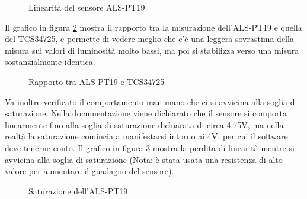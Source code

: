 \begin{figure}[h!]
	\centering
	\caption{Linearità del sensore ALS-PT19}
	\label{fig:pt19_linearity}
\end{figure}

Il grafico in figura \ref{fig:pt19_linearity3} mostra il rapporto tra la misurazione dell'ALS-PT19 e quella del TCS34725, e permette di vedere meglio che c'è una leggera sovrastima della misura sui valori di luminosità molto bassi, ma poi si stabilizza verso una misura sostanzialmente identica.
\begin{figure}[h!]
	\centering
	\caption{Rapporto tra ALS-PT19 e TCS34725}
	\label{fig:pt19_linearity3}
\end{figure}

Va inoltre verificato il comportamento man mano che ci si avvicina alla soglia di saturazione. Nella documentazione viene dichiarato che il sensore si comporta linearmente fino alla soglia di saturazione dichiarata di circa 4.75V\cite{als_pt19_datasheet}, ma nella realtà la saturazione comincia a manifestarsi intorno ai 4V, per cui il software deve tenerne conto. Il grafico in figura \ref{fig:pt19_linearity4} mostra la perdita di linearità mentre si avvicina alla soglia di saturazione (Nota: è stata usata una resistenza di alto valore per aumentare il guadagno del sensore).

\begin{figure}[h!]
	\centering
	\caption{Saturazione dell'ALS-PT19}
	\label{fig:pt19_linearity4}
\end{figure}

